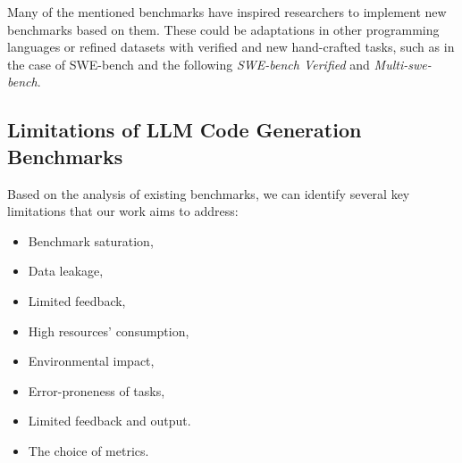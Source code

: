 Many of the mentioned benchmarks have inspired researchers to implement new benchmarks based on them. These could be adaptations in other programming languages or refined datasets with verified and new hand-crafted tasks, such as in the case of SWE-bench and the following \textit{SWE-bench Verified} and \textit{Multi-swe-bench}.




\subsection{Limitations of LLM Code Generation Benchmarks}



Based on the analysis of existing benchmarks, we can identify several key limitations that our work aims to address:
\begin{itemize}
    \item Benchmark saturation,
    \item Data leakage,
    \item Limited feedback,
    \item High resources' consumption,
    \item Environmental impact,
    \item Error-proneness of tasks,
    \item Limited feedback and output.
    \item The choice of metrics.
\end{itemize}


